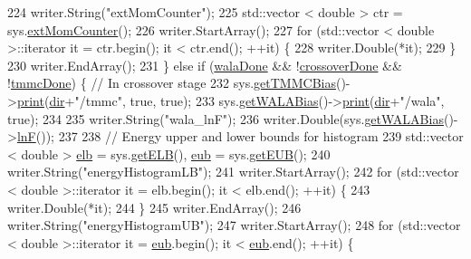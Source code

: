 \begin{DoxyCode}
224         writer.String(\textcolor{stringliteral}{"extMomCounter"});
225         std::vector < double > ctr = sys.\hyperlink{classsim_system_a1744c4c22603662081d75985bc30b754}{extMomCounter}();
226         writer.StartArray();
227         \textcolor{keywordflow}{for} (std::vector < double >::iterator it = ctr.begin(); it < ctr.end(); ++it) \{
228             writer.Double(*it);
229         \}
230         writer.EndArray();
231     \} \textcolor{keywordflow}{else} \textcolor{keywordflow}{if} (\hyperlink{classcheckpoint_aab066479e2ca6656d0031dd46a2fc1a5}{walaDone} && !\hyperlink{classcheckpoint_a4f13612ea6d376bb327295bfce3a70c5}{crossoverDone} && !\hyperlink{classcheckpoint_acbe0c62aa82735741a9f396827966823}{tmmcDone}) \{ \textcolor{comment}{// In crossover
       stage}
232         sys.\hyperlink{classsim_system_aa31d40c91cb50f143a9613d362798887}{getTMMCBias}()->\hyperlink{classtmmc_ad49e147dc88b3e1c2975269598f94327}{print}(\hyperlink{classcheckpoint_a0e0f999ee8e0b09541e9131baa8a591d}{dir}+\textcolor{stringliteral}{"/tmmc"}, \textcolor{keyword}{true}, \textcolor{keyword}{true});
233         sys.\hyperlink{classsim_system_a7cb5049de8b0988349e89e30e4000407}{getWALABias}()->\hyperlink{classwala_a65569289fac85d0da9c336e17c9d809a}{print}(\hyperlink{classcheckpoint_a0e0f999ee8e0b09541e9131baa8a591d}{dir}+\textcolor{stringliteral}{"/wala"}, \textcolor{keyword}{true});
234 
235         writer.String(\textcolor{stringliteral}{"wala\_lnF"});
236         writer.Double(sys.\hyperlink{classsim_system_a7cb5049de8b0988349e89e30e4000407}{getWALABias}()->\hyperlink{classwala_acb8e59580d97bc3c5b9b4ff45eb6bb9a}{lnF}());
237 
238         \textcolor{comment}{// Energy upper and lower bounds for histogram}
239         std::vector < double > \hyperlink{classcheckpoint_a2338cb624f19eb6776c10f9bb83b2a5d}{elb} = sys.\hyperlink{classsim_system_a610cbb1c6059151e420dbd42dd9da714}{getELB}(), \hyperlink{classcheckpoint_a7071b01d0936873321d0a706e761b6ac}{eub} = sys.\hyperlink{classsim_system_ae87e0ac03cc11259cd3b44c780a90a06}{getEUB}();
240         writer.String(\textcolor{stringliteral}{"energyHistogramLB"});
241         writer.StartArray();
242         \textcolor{keywordflow}{for} (std::vector < double >::iterator it = elb.begin(); it < elb.end(); ++it) \{
243             writer.Double(*it);
244         \}
245         writer.EndArray();
246         writer.String(\textcolor{stringliteral}{"energyHistogramUB"});
247         writer.StartArray();
248         \textcolor{keywordflow}{for} (std::vector < double >::iterator it = \hyperlink{classcheckpoint_a7071b01d0936873321d0a706e761b6ac}{eub}.begin(); it < \hyperlink{classcheckpoint_a7071b01d0936873321d0a706e761b6ac}{eub}.end(); ++it) \{

\end{DoxyCode}
